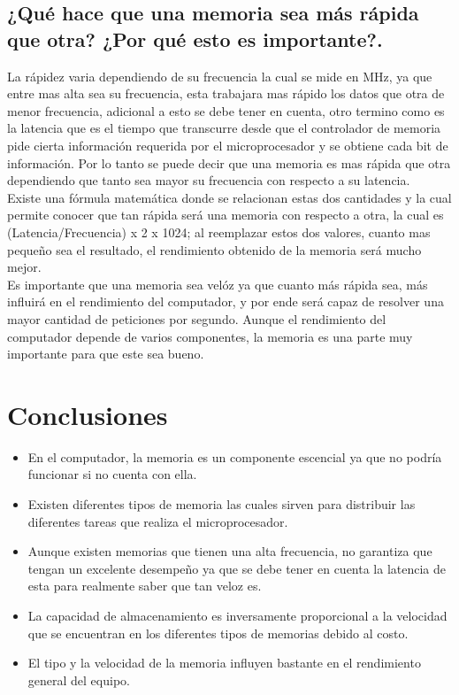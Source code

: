 \documentclass{article}
\begin{document}
\subsection{\textbf{¿Qué hace que una memoria sea más rápida que otra? ¿Por qué esto es importante?.}}
La rápidez varia dependiendo de su frecuencia la cual se mide en MHz, ya que entre mas alta sea su frecuencia, esta trabajara mas rápido los datos que otra de menor frecuencia, adicional a esto se debe tener en cuenta, otro termino como es la latencia que es el tiempo que transcurre desde que el controlador de memoria pide cierta información requerida por el microprocesador y se obtiene cada bit de información. Por lo tanto se puede decir que una memoria es mas rápida que otra dependiendo que tanto sea mayor su frecuencia con respecto a su latencia.\cite{hardzone}\\
Existe una fórmula matemática donde se relacionan estas dos cantidades y la cual permite conocer que tan rápida será una memoria con respecto a otra, la cual es (Latencia/Frecuencia) x 2 x 1024; \cite{computer} al reemplazar estos dos valores, cuanto mas pequeño sea el resultado, el rendimiento obtenido de la memoria será mucho mejor.\\
Es importante que una memoria sea velóz ya que cuanto más rápida sea, más influirá en el rendimiento del computador, y por ende será capaz de resolver una mayor cantidad de peticiones por segundo. Aunque el rendimiento del computador depende de varios componentes, la memoria es una parte muy importante para que este sea bueno. \cite{computer}

\newpage    

\section{Conclusiones} \label{conclusion}

\begin{itemize}
    \item En el computador, la memoria es un componente escencial ya que no podría funcionar si no cuenta con ella.
    \item Existen diferentes tipos de memoria las cuales sirven para distribuir las diferentes tareas que realiza el microprocesador.
    \item Aunque existen memorias que tienen una alta frecuencia, no garantiza que tengan un excelente desempeño ya que se debe tener en cuenta la latencia de esta para realmente saber que tan veloz es.
    \item La capacidad de almacenamiento es inversamente proporcional a la velocidad que se encuentran en los diferentes tipos de memorias debido al costo.
    \item El tipo y la velocidad de la memoria influyen bastante en el rendimiento general del equipo.
    
\end{itemize}



\end{document}
